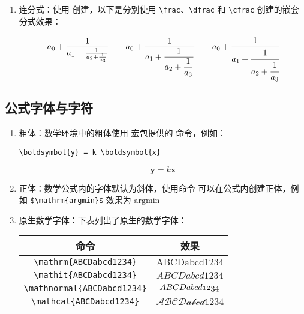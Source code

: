 \begin{enumerate}
\item 连分式：使用 \boxforcmd{\\cfrac} 创建，以下是分别使用 \verb|\frac|、\verb|\dfrac| 和 \verb|\cfrac| 创建的嵌套分式效果：

\begin{tcolorbox}[colback=white]
\[
    a_0+\frac{1}{a_1+\frac{1}{a_2+\frac{1}{a_3}}}
    \qquad
    a_0+\dfrac{1}{a_1+\dfrac{1}{a_2+\dfrac{1}{a_3}}}
    \qquad
    a_0+\cfrac{1}{a_1+\cfrac{1}{a_2+\cfrac{1}{a_3}}}
\]
\end{tcolorbox}


\end{enumerate}
\subsection{公式字体与字符}
\begin{enumerate}

\item 粗体：数学环境中的粗体使用  宏包提供的 \boxforcmd{\\boldsymbol\{\}} 命令，例如：

\begin{tcolorbox}[sidebyside]
\begin{lstlisting}
\boldsymbol{y} = k \boldsymbol{x}
\end{lstlisting} 

\tcblower

$$ \boldsymbol{y} = k \boldsymbol{x} $$
\end{tcolorbox}

\item 正体：数学公式内的字体默认为斜体，使用命令 \boxforcmd{\\mathrm\{\}} 可以在公式内创建正体，例如 \verb|$\mathrm{argmin}$| 效果为 $\mathrm{argmin}$

\item 原生数学字体：下表列出了原生的数学字体：

\begin{tcolorbox}[colback=white]
\begin{center}
\begin{tabular}{cc}
    命令 & 效果 \\
    \hline
    \verb|\mathrm{ABCDabcd1234}| & $\mathrm{ABCDabcd1234}$ \\
    \verb|\mathit{ABCDabcd1234}| & $\mathit{ABCDabcd1234}$ \\
    \verb|\mathnormal{ABCDabcd1234}| & $\mathnormal{ABCDabcd1234}$ \\
    \verb|\mathcal{ABCDabcd1234}| & $\mathcal{ABCDabcd1234}$ \\
\end{tabular}
\end{center}
\end{tcolorbox}


\end{enumerate}
